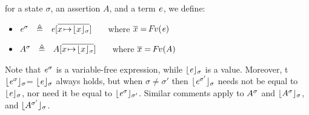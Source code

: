 \documentclass[acmsmall,review,anonymous,screen]{acmart}\settopmatter{printfolios=true,printacmref=false}
\begin{document}
\begin{definition} for a state  $\sigma$, an assertion $A$, and a term $\mathit{e}$, we define:
$~ \ $

\begin{itemize}
\item
$\as {\re} {\sigma}\ \  \triangleq \ \ {\re}[\overline {x\! \mapsto\! \interpret {\sigma} {x}}] $ \ \ \  where $\overline x = {\hspace{-1pt}F\hspace{-1pt}}v(\mathit{e})$
\item
$\as {A} {\sigma}\ \  \triangleq \ \ {A}[\overline {x\! \mapsto\! \interpret {\sigma} {x}}] $ \ \ \  where $\overline x = {\hspace{-1pt}F\hspace{-1pt}}v(A)$
\end{itemize}
\end{definition}

Note that  $\mathit{e}^{\sigma}$  is a variable-free expression, while $\lfloor \mathit{e} \rfloor_{\sigma}$ is a value. 
Moreover,  t $\lfloor \mathit{e}^{\sigma} \rfloor_{\sigma}$= $\lfloor \mathit{e} \rfloor_{\sigma}$ always holds, but when $\sigma \neq \sigma'$ then
$\lfloor \mathit{e}^{\sigma'} \rfloor_{\sigma}$ needs not be equal to  $\lfloor \mathit{e} \rfloor_{\sigma}$, nor need it be equal to $\lfloor \mathit{e}^{\sigma} \rfloor_{\sigma'}$. Similar comments apply to $A^{\sigma}$ and $\lfloor A^{\sigma} \rfloor_{\sigma}$, and $\lfloor A^{\sigma'} \rfloor_{\sigma}$.
 
\end{document}
